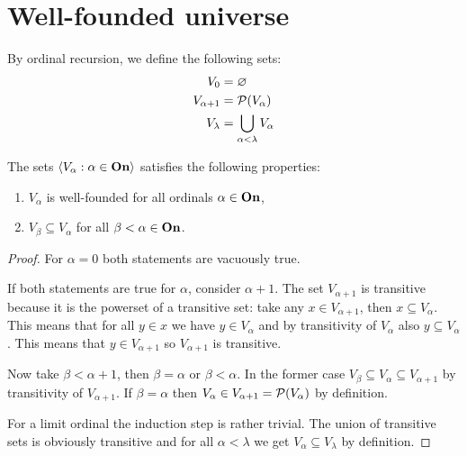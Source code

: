 \section{Well-founded universe}
\begin{definition}
    By ordinal recursion, we define the following sets:
    \begin{align*}
        V_{0}        & =\varnothing                        \\
        V_{\alpha+1} & =\mathcal{P}(V_{\alpha})                \\
        V_{\lambda}  & =\bigcup_{\alpha<\lambda}V_{\alpha} \\
    \end{align*}
\end{definition}

\begin{theorem}
    The sets \(\left<V_{\alpha}:\alpha\in{\bf On}\right>\) satisfies the
    following properties:
    \begin{enumerate}
        \item \(V_{\alpha}\) is well-founded for all ordinals
              \(\alpha\in{\bf On}\),
        \item \(V_{\beta}\subseteq V_{\alpha}\) for all
              \(\beta<\alpha\in{\bf On}\).
    \end{enumerate}

    \begin{proof}
        For \(\alpha=0\) both statements are vacuously true.

        If both statements are true for \(\alpha\), consider \(\alpha+1\). The
        set \(V_{\alpha+1}\) is transitive because it is the powerset of a
        transitive set: take any \(x\in V_{\alpha+1}\), then \(x\subseteq
        V_{\alpha}\). This means that for all \(y\in x\) we have \(y\in
        V_{\alpha}\) and by transitivity of \(V_{\alpha}\) also \(y\subseteq
        V_{\alpha}\). This means that \(y\in V_{\alpha+1}\) so \(V_{\alpha+1}\)
        is transitive.

        Now take \(\beta<\alpha+1\), then \(\beta=\alpha\) or \(\beta<\alpha\).
        In the former case \(V_{\beta}\subseteq V_{\alpha}\subseteq
        V_{\alpha+1}\) by transitivity of \(V_{\alpha+1}\). If \(\beta=\alpha\)
        then \(V_{\alpha}\in V_{\alpha+1}=\mathcal{P}(V_{\alpha})\) by definition.

        For a limit ordinal the induction step is rather trivial. The union of
        transitive sets is obviously transitive and for all \(\alpha<\lambda\)
        we get \(V_{\alpha}\subseteq V_{\lambda}\) by definition.
    \end{proof}
\end{theorem}

